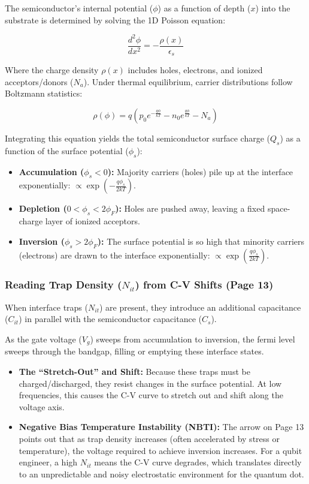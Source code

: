 \documentclass[
]{article}
\providecommand{\tightlist}{%
  \setlength{\itemsep}{0pt}\setlength{\parskip}{0pt}}
\begin{document}
The semiconductor's internal potential (\(\phi\)) as a function of depth
(\(x\)) into the substrate is determined by solving the 1D Poisson
equation:

\[\frac{d^2\phi}{dx^2} = -\frac{\rho(x)}{\epsilon_s}\]

Where the charge density \(\rho(x)\) includes holes, electrons, and
ionized acceptors/donors (\(N_a\)). Under thermal equilibrium, carrier
distributions follow Boltzmann statistics:

\[\rho(\phi) = q \left( p_0 e^{-\frac{q\phi}{kT}} - n_0 e^{\frac{q\phi}{kT}} - N_a \right)\]

Integrating this equation yields the total semiconductor surface charge
(\(Q_s\)) as a function of the surface potential (\(\phi_s\)):

\begin{itemize}
\tightlist
\item
  \textbf{Accumulation (\(\phi_s < 0\)):} Majority carriers (holes) pile
  up at the interface exponentially:
  \(\propto \exp\left(-\frac{q\phi_s}{2kT}\right)\).
\item
  \textbf{Depletion (\(0 < \phi_s < 2\phi_F\)):} Holes are pushed away,
  leaving a fixed space-charge layer of ionized acceptors.
\item
  \textbf{Inversion (\(\phi_s > 2\phi_F\)):} The surface potential is so
  high that minority carriers (electrons) are drawn to the interface
  exponentially: \(\propto \exp\left(\frac{q\phi_s}{2kT}\right)\).
\end{itemize}

\subsubsection{\texorpdfstring{Reading Trap Density (\(N_{it}\)) from
C-V Shifts (Page
13)}{Reading Trap Density (N\_\{it\}) from C-V Shifts (Page 13)}}\label{reading-trap-density-n_it-from-c-v-shifts-page-13}

When interface traps (\(N_{it}\)) are present, they introduce an
additional capacitance (\(C_{it}\)) in parallel with the semiconductor
capacitance (\(C_s\)).

As the gate voltage (\(V_g\)) sweeps from accumulation to inversion, the
fermi level sweeps through the bandgap, filling or emptying these
interface states.

\begin{itemize}
\tightlist
\item
  \textbf{The ``Stretch-Out'' and Shift:} Because these traps must be
  charged/discharged, they resist changes in the surface potential. At
  low frequencies, this causes the C-V curve to stretch out and shift
  along the voltage axis.
\item
  \textbf{Negative Bias Temperature Instability (NBTI):} The arrow on
  Page 13 points out that as trap density increases (often accelerated
  by stress or temperature), the voltage required to achieve inversion
  increases. For a qubit engineer, a high \(N_{it}\) means the C-V curve
  degrades, which translates directly to an unpredictable and noisy
  electrostatic environment for the quantum dot.
\end{itemize}
\end{document}
